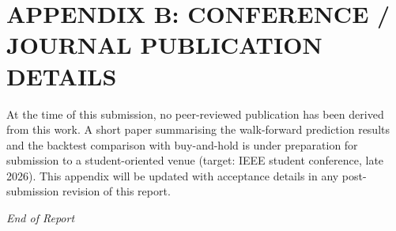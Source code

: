 \documentclass[12pt,a4paper]{report}
\numberwithin{equation}{chapter}
\begin{document}
\chapter*{APPENDIX B: CONFERENCE / JOURNAL PUBLICATION DETAILS}

At the time of this submission, no peer-reviewed publication has been derived from this work. A short paper summarising the walk-forward prediction results and the backtest comparison with buy-and-hold is under preparation for submission to a student-oriented venue (target: IEEE student conference, late 2026). This appendix will be updated with acceptance details in any post-submission revision of this report.

\vspace{1cm}
\hfill \textit{End of Report}
\end{document}

